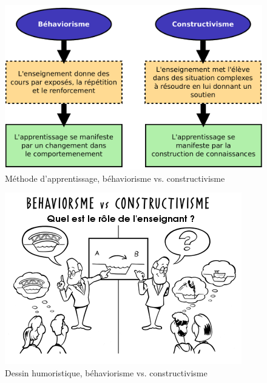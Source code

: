 \begin{figure}[H]
  \centering
  \includegraphics[width=\textwidth]{../resources/illustrations/behaviorisme_constructivisme}
  \caption{Méthode d'apprentissage, béhaviorisme vs. constructivisme}
  \label{fig:behaviorisme_vs_constructivisme_illu}
\end{figure}
\begin{figure}[H]
  \centering
  \includegraphics[width=\textwidth]{../resources/illustrations/behaviorisme_vs_constructivisme}
  \caption{Dessin humoristique, béhaviorisme vs. constructivisme}
  \label{fig:behaviorisme_vs_constructivisme_dessin}
\end{figure}
